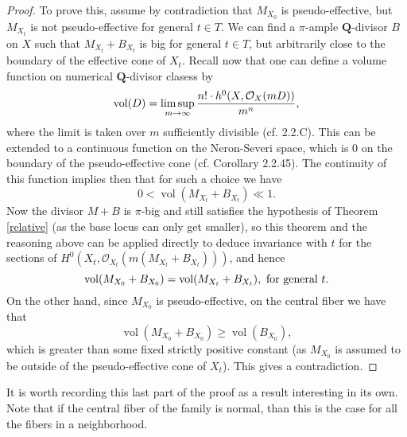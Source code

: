 \documentclass[11pt]{amsart}
\theoremstyle{plain}
\theoremstyle{definition}
\newcommand{\QQ}{\mathbf{Q}}
\newcommand{\OO}{\mathcal  {O}}
\DeclareMathOperator{\vol}{vol}
\begin{document}
\begin{proof}
To prove this, assume by contradiction that $M_{X_0}$ is pseudo-effective, but $M_{X_t}$ is not pseudo-effective for general $t \in T$. We can find a $\pi$-ample $\QQ$-divisor $B$ on $X$ such that $M_{X_t} + B_{X_t}$ is big for general $t\in T$, but arbitrarily close to the boundary of the effective 
cone of $X_t$. Recall now that one can define a volume function on numerical $\QQ$-divisor clasess
by 
$${\rm vol}(D) = \limsup_{m\to\infty}\frac{n!\cdot h^0(X, \OO_X(mD))}{m^n},$$ 
where the limit is taken over $m$ sufficiently divisible (cf. \cite{positivity} 2.2.C). This can be extended to a continuous function on the Neron-Severi space, which is $0$ on the boundary of the pseudo-effective cone (cf. \cite{positivity} Corollary 2.2.45). The continuity of this function 
implies then that for such a choice we have 
$$0 < \vol (M_{X_t} + B_{X_t}) \ll1.$$ 
Now the divisor $M + B$ is $\pi$-big and still satisfies the hypothesis of Theorem \ref{relative} (as the base locus can only get smaller), so this theorem and the reasoning above can be applied directly to deduce invariance with $t$ for the sections of $H^0 (X_t , \OO_{X_t}
(m (M_{X_t} + B_{X_t})))$, and hence
$$\vol (M_{X_0}  + B_{X_0}) =  \vol (M_{X_t}  + B_{X_t}), {\rm~for~general~}t.$$
On the other hand, since $M_{X_0}$ is pseudo-effective, on the central fiber we have that
$$\vol (M_{X_0}  + B_{X_0}) \ge \vol (B_{X_0}),$$
which is greater than some fixed strictly positive constant  (as $M_{X_0}$ is assumed to be outside of the pseudo-effective cone of 
$X_t$). This gives a contradiction.
\end{proof}

It is worth recording this last part of the proof as a result interesting in its own. Note that if the central fiber of the family 
is normal, than this is the case for all the fibers in a neighborhood.
\end{document}
